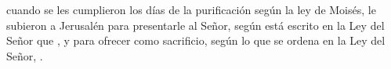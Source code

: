  cuando se les cumplieron los días de la purificación según la ley de Moisés, le subieron a Jerusalén para presentarle al Señor,
según está escrito en la Ley del Señor que , y para ofrecer como sacrificio,
según lo que se ordena en la Ley del Señor, . 